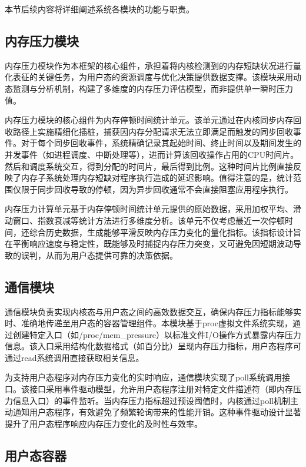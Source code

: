 本节后续内容将详细阐述系统各模块的功能与职责。


\subsection{内存压力模块}

内存压力模块作为本框架的核心组件，承担着将内核检测到的内存短缺状况进行量化表征的关键任务，为用户态的资源调度与优化决策提供数据支撑。该模块采用动态监测与分析机制，构建了多维度的内存压力评估模型，而非提供单一瞬时压力值。

内存压力模块的核心组件为内存停顿时间统计单元。该单元通过在内核同步内存回收路径上实施精细化插桩，捕获因内存分配请求无法立即满足而触发的同步回收事件。对于每个同步回收事件，系统精确记录其起始时间、终止时间以及期间发生的并发事件（如进程调度、中断处理等），进而计算该回收操作占用的CPU时间片。然后和调度系统交互，得到分配的时间片，最后得到比例。这种时间片比例直接反映了内存子系统处理内存短缺对程序执行造成的延迟影响。值得注意的是，统计范围仅限于同步回收导致的停顿，因为异步回收通常不会直接阻塞应用程序执行。

内存压力计算单元基于内存停顿时间统计单元提供的原始数据，采用加权平均、滑动窗口、指数衰减等统计方法进行多维度分析。该单元不仅考虑最近一次停顿时间，还综合历史数据，生成能够平滑反映内存压力变化的量化指标。该指标设计旨在平衡响应速度与稳定性，既能够及时捕捉内存压力突变，又可避免因短期波动导致的误判，从而为用户态提供可靠的决策依据。

\subsection{通信模块}

通信模块负责实现内核态与用户态之间的高效数据交互，确保内存压力指标能够实时、准确地传递至用户态的容器管理组件。本模块基于proc虚拟文件系统实现，通过创建特定入口（如/proc/mem_pressure）以标准文件I/O操作方式暴露内存压力信息。该入口采用结构化数据格式（如百分比）呈现内存压力指标，用户态程序可通过read系统调用直接获取相关信息。

为支持用户态程序对内存压力变化的实时响应，通信模块实现了poll系统调用接口。该接口采用事件驱动模型，允许用户态程序注册对特定文件描述符（即内存压力信息入口）的事件监听。当内存压力指标超过预设阈值时，内核通过poll机制主动通知用户态程序，有效避免了频繁轮询带来的性能开销。这种事件驱动设计显著提升了用户态程序响应内存压力变化的及时性与效率。

\subsection{用户态容器}

